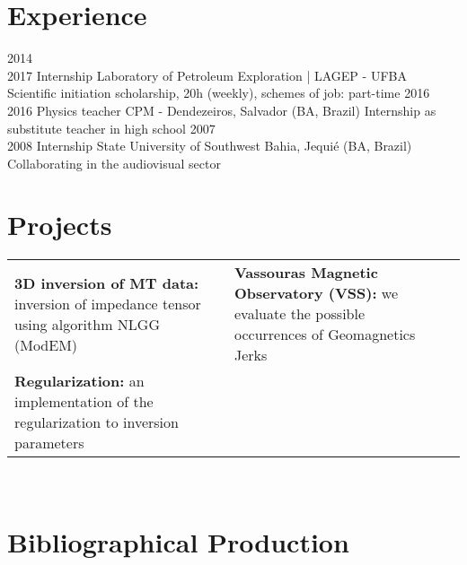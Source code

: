 \documentclass[a4paper]{my_cv}
\begin{document}
\section{Experience}
\begin{entrylist}
	\entry
	{2014~\textemdash \\2017}
	{Internship}
	{Laboratory of Petroleum Exploration | LAGEP - UFBA}
	{Scientific initiation scholarship, 20h (weekly), schemes of job: part-time}
	\entry
	{2016~\textemdash \\2016}
	{Physics teacher}
	{CPM - Dendezeiros, Salvador (BA, Brazil)}
	{Internship as substitute teacher in high school}
	\entry	
	{2007~\textemdash \\2008}
	{Internship}
	{State University of Southwest Bahia, Jequié (BA, Brazil)}
	{Collaborating in the audiovisual sector}
\end{entrylist}

\section{Projects}
\setlength{\tabcolsep}{15pt}
\begin{tabularx}{1.07\textwidth}{XXX}
	\textbf{3D inversion of MT data:} inversion of impedance tensor using algorithm NLGG (ModEM) &
	\textbf{Vassouras Magnetic Observatory (VSS):} we evaluate the possible occurrences of Geomagnetics Jerks\\
	\textbf{Regularization:} an implementation of the regularization to inversion parameters
	\textbf{} \\
\end{tabularx}
~
\section{Bibliographical Production }
\bodyfont

\begin{aplist}
	
	

\end{aplist}
\end{document}
